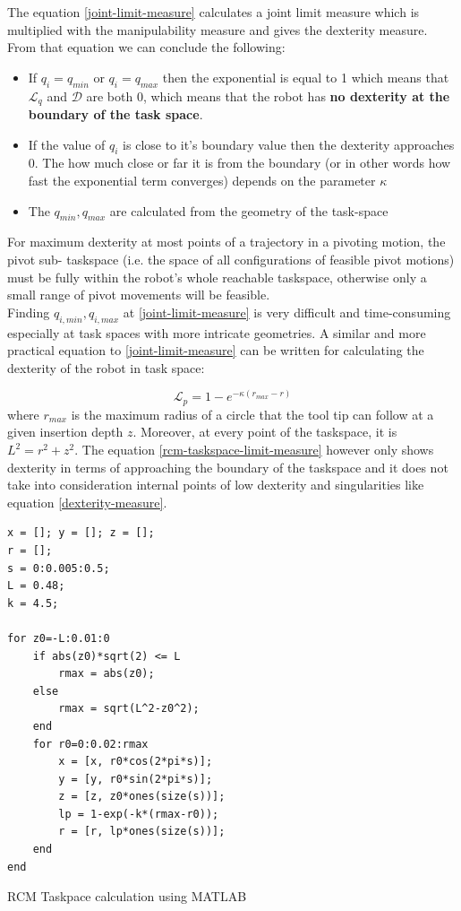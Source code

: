 The equation \ref{joint-limit-measure} calculates a joint limit measure which is multiplied with the manipulability measure and gives the dexterity measure.
From that equation we can conclude the following:
\begin{itemize}
\item If $q_i = q_{min}$ or $q_i = q_{max}$ then the exponential is equal to 1 which means that $\mathcal{L}_{q}$ and $\mathcal{D}$ are both 0, which means 
that the robot has \textbf{no dexterity at the boundary of the task space}.
\item If the value of $q_i$ is close to it's boundary value then the dexterity approaches 0. The how much close or far it is from the boundary (or in other words 
how fast the exponential term converges) depends on the parameter $\kappa$
\item The $q_{min}, q_{max}$ are calculated from the geometry of the task-space
\end{itemize}

For maximum dexterity at most points of a trajectory in a pivoting motion, the pivot sub-
taskspace (i.e. the space of all configurations of feasible pivot motions) must be fully within 
the robot’s whole reachable taskspace, otherwise only a small range of pivot movements will be 
feasible.\\

Finding $q_{i,min}, q_{i,max}$ at \ref{joint-limit-measure} is very difficult and time-consuming especially at task spaces with more intricate geometries. 
A similar and more practical equation to \ref{joint-limit-measure} can be written for calculating the dexterity of the robot in task space:

\begin{equation}
\label{rcm-taskspace-limit-measure}
\mathcal{L}_{p}=1-e^{-\kappa (r_{max} - r)}
\end{equation}
where $r_{max}$ is the maximum radius of a circle that the tool tip can follow at a given insertion depth $z$. Moreover, at every point of the taskspace, it is $L^2 = r^2 + z^2$. 
The equation \ref{rcm-taskspace-limit-measure} however only shows dexterity in terms of approaching the boundary of the taskspace and it does not take into consideration internal points of low 
dexterity and singularities like equation \ref{dexterity-measure}.

\begin{listing}[H]
\begin{verbatim}
x = []; y = []; z = [];
r = [];
s = 0:0.005:0.5;
L = 0.48;
k = 4.5;

for z0=-L:0.01:0
    if abs(z0)*sqrt(2) <= L
        rmax = abs(z0);
    else
        rmax = sqrt(L^2-z0^2);
    end
    for r0=0:0.02:rmax
        x = [x, r0*cos(2*pi*s)];
        y = [y, r0*sin(2*pi*s)];
        z = [z, z0*ones(size(s))];
        lp = 1-exp(-k*(rmax-r0));
        r = [r, lp*ones(size(s))];
    end
end
\end{verbatim}
\caption{RCM Taskpace calculation using MATLAB}
\label{code:rcm_taskspace_matlab}
\end{listing}

